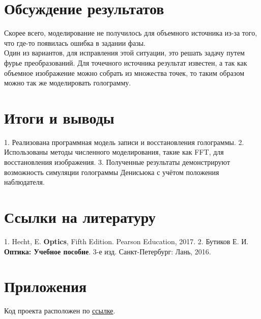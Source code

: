 \documentclass[aps,twocolumn,secnumarabic,balancelastpage,amsmath,amssymb,nofootinbib, floatfix]{revtex4-1}
\begin{document}
\section{Обсуждение результатов}
Скорее всего, моделирование не получилось для объемного источника из-за того, что где-то появилась ошибка в задании фазы. \\ 
Один из вариантов, для исправления этой ситуации, это решать задачу путем фурье преобразований. Для точечного источника результат известен, а так как объемное изображение можно собрать из множества точек, то таким образом можно так же моделировать голограмму.
\section{ Итоги и выводы  }

1. Реализована программная модель записи и восстановления голограммы.  
2. Использованы методы численного моделирования, такие как FFT, для восстановления изображения.  
3. Полученные результаты демонстрируют возможность симуляции голограммы Денисьюка с учётом положения наблюдателя.  

\section{Ссылки на литературу}  

1. Hecht, E. \textbf{Optics}, Fifth Edition. Pearson Education, 2017.  
2. Бутиков Е. И. \textbf{Оптика: Учебное пособие}. 3-е изд. Санкт-Петербург: Лань, 2016.  

\section{Приложения}  
Код проекта расположен по \href{https://github.com/ArinaLuzgina/holographySimulation}{ссылке}.
\end{document}
